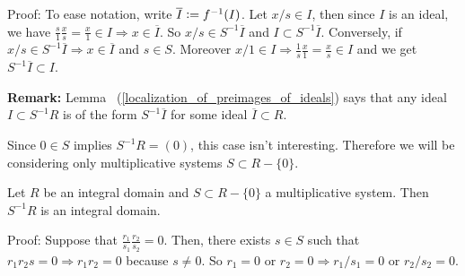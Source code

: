 Proof: To ease notation, write $\overline{I}\bydef f^{-1}(I)$. Let $x/s\in I$, then since $I$ is an ideal, we have $\frac{s}{1}\frac{x}{s}=\frac{x}{1}\in I\Rightarrow x\in\overline{I}$. So $x/s\in S^{-1}\overline{I}$ and $I\subset S^{-1}\overline{I}$. Conversely, if $x/s\in S^{-1}\overline{I}\Rightarrow x\in \overline{I}$ and $s\in S$. Moreover $x/1\in I\Rightarrow \frac{1}{s}\frac{x}{1}=\frac{x}{s}\in I$ and we get $S^{-1}\overline{I}\subset I$.
\begin{dang}
    \textbf{Remark: }Lemma ~(\ref{localization_of_preimages_of_ideals}) says that any ideal $I\subset S^{-1}R$ is of the form $S^{-1}\overline{I}$ for some ideal $\overline{I}\subset R$.
\end{dang}
 
Since $0\in S$ implies $S^{-1}R=(0)$, this case isn't interesting. Therefore we will be considering only multiplicative systems $S\subset R-\{0\}$.

\begin{dang}
    \begin{lemma}\label{R_is_PID_localization_PID}
    Let $R$ be an integral domain and $S\subset R-\{0\}$ a multiplicative system. Then $S^{-1}R$ is an integral domain.
    \end{lemma}
\end{dang}
Proof: Suppose that $\frac{r_1}{s_1}\frac{r_2}{s_2}=0$. Then, there exists $s\in S$ such that $r_1r_2s=0\Rightarrow r_1r_2=0$ because $s\neq0$. So $r_1=0$ or $r_2=0\Rightarrow r_1/s_1=0$ or $r_2/s_2=0$. 

